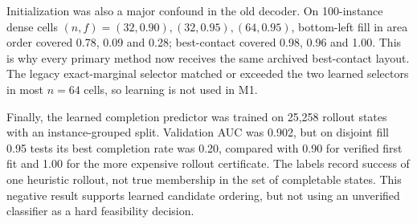 \documentclass[11pt]{article}
\begin{document}
Initialization was also a major confound in the old decoder. On 100-instance
dense cells $(n,f)=(32,0.90),(32,0.95),(64,0.95)$, bottom-left fill in area
order covered 0.78, 0.09 and 0.28; best-contact covered 0.98, 0.96 and 1.00.
This is why every primary method now receives the same archived best-contact
layout. The legacy exact-marginal selector matched or exceeded the two learned
selectors in most $n=64$ cells, so learning is not used in M1.

Finally, the learned completion predictor was trained on 25,258 rollout states
with an instance-grouped split. Validation AUC was 0.902, but on disjoint fill
0.95 tests its best completion rate was 0.20, compared with 0.90 for verified
first fit and 1.00 for the more expensive rollout certificate. The labels record
success of one heuristic rollout, not true membership in the set of completable
states. This negative result supports learned candidate ordering, but not using
an unverified classifier as a hard feasibility decision.
\end{document}
